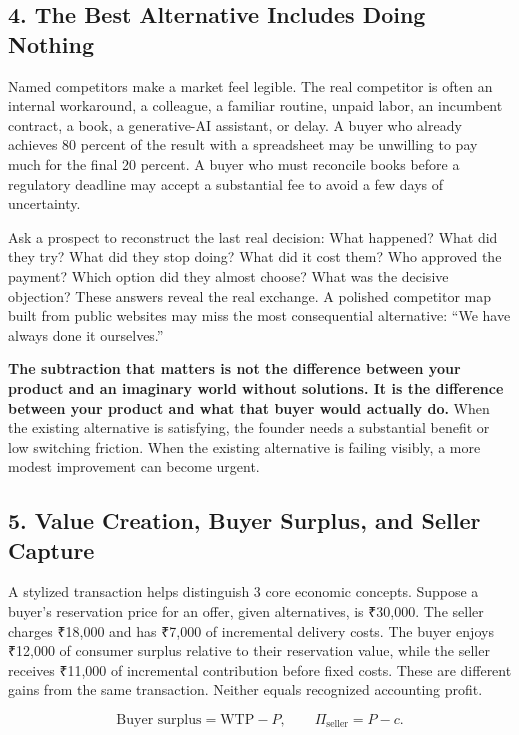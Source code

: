 \subsection*{4. The Best Alternative Includes Doing Nothing}

Named competitors make a market feel legible. The real competitor is often an internal workaround, a colleague, a familiar routine, unpaid labor, an incumbent contract, a book, a generative-AI assistant, or delay. A buyer who already achieves 80 percent of the result with a spreadsheet may be unwilling to pay much for the final 20 percent. A buyer who must reconcile books before a regulatory deadline may accept a substantial fee to avoid a few days of uncertainty.

Ask a prospect to reconstruct the last real decision: What happened? What did they try? What did they stop doing? What did it cost them? Who approved the payment? Which option did they almost choose? What was the decisive objection? These answers reveal the real exchange. A polished competitor map built from public websites may miss the most consequential alternative: ``We have always done it ourselves.''

\textbf{The subtraction that matters is not the difference between your product and an imaginary world without solutions. It is the difference between your product and what that buyer would actually do.} When the existing alternative is satisfying, the founder needs a substantial benefit or low switching friction. When the existing alternative is failing visibly, a more modest improvement can become urgent.

\subsection*{5. Value Creation, Buyer Surplus, and Seller Capture}

A stylized transaction helps distinguish 3 core economic concepts. Suppose a buyer's reservation price for an offer, given alternatives, is ₹30,000. The seller charges ₹18,000 and has ₹7,000 of incremental delivery costs. The buyer enjoys ₹12,000 of consumer surplus relative to their reservation value, while the seller receives ₹11,000 of incremental contribution before fixed costs. These are different gains from the same transaction. Neither equals recognized accounting profit.

\begin{equation}
\text{Buyer surplus} = \text{WTP} - P, \qquad \Pi_{\text{seller}} = P - c.
\end{equation}

